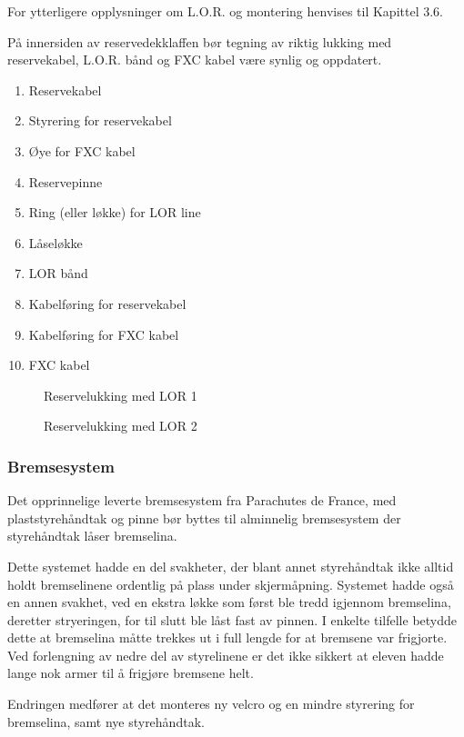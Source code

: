 For ytterligere opplysninger om L.O.R. og montering henvises til Kapittel 3.6.

På innersiden av reservedekklaffen bør tegning av riktig lukking med reservekabel, L.O.R. bånd og FXC kabel være synlig og oppdatert.

\begin{enumerate}
	\item Reservekabel
	\item Styrering for reservekabel
	\item Øye for FXC kabel
	\item Reservepinne
	\item Ring (eller løkke) for LOR line
	\item Låseløkke
	\item LOR bånd
	\item Kabelføring for reservekabel
	\item Kabelføring for FXC kabel
	\item FXC kabel
\end{enumerate}

\begin{figure}
	\caption{Reservelukking med LOR 1}
\end{figure}

\begin{figure}
	\caption{Reservelukking med LOR 2}
\end{figure}

\subsubsection{Bremsesystem}
Det opprinnelige leverte bremsesystem fra Parachutes de France, med plaststyrehåndtak og pinne bør byttes til alminnelig bremsesystem der styrehåndtak låser bremselina.

Dette systemet hadde en del svakheter, der blant annet styrehåndtak ikke alltid holdt bremselinene ordentlig på plass under skjermåpning. Systemet hadde også en annen svakhet, ved en ekstra løkke som først ble tredd igjennom bremselina, deretter stryeringen, for til slutt ble låst fast av pinnen. I enkelte tilfelle betydde dette at bremselina måtte trekkes ut i full lengde for at bremsene var frigjorte. Ved forlengning av nedre del av styrelinene er det ikke sikkert at eleven hadde lange nok armer til å frigjøre bremsene helt.

Endringen medfører at det monteres ny velcro og en mindre styrering for bremselina, samt nye styrehåndtak.

